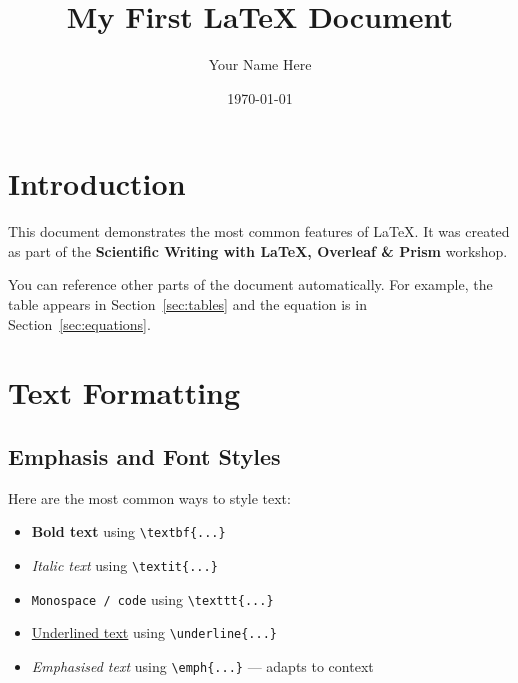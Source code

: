 \documentclass[12pt, a4paper]{article}
\title{My First \LaTeX{} Document}
\author{Your Name Here}
\date{\today}   %
\begin{document}
\maketitle

\tableofcontents
\newpage

\section{Introduction}
\label{sec:introduction}

This document demonstrates the most common features of \LaTeX{}.
It was created as part of the \textbf{Scientific Writing with LaTeX, Overleaf
\& Prism} workshop.

You can reference other parts of the document automatically.
For example, the table appears in Section~\ref{sec:tables} and the equation
is in Section~\ref{sec:equations}.

\section{Text Formatting}
\label{sec:formatting}

\subsection{Emphasis and Font Styles}

Here are the most common ways to style text:

\begin{itemize}
    \item \textbf{Bold text} using \verb|\textbf{...}|
    \item \textit{Italic text} using \verb|\textit{...}|
    \item \texttt{Monospace / code} using \verb|\texttt{...}|
    \item \underline{Underlined text} using \verb|\underline{...}|
    \item \emph{Emphasised text} using \verb|\emph{...}| — adapts to context
\end{itemize}
\end{document}
